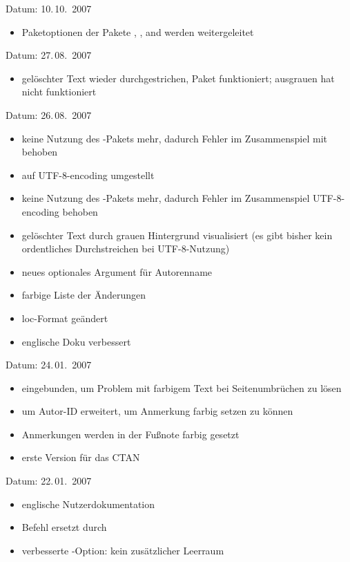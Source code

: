 Datum: 10.\,10.~2007
\begin{itemize}
	\item Paketoptionen der Pakete , , and  werden weitergeleitet
\end{itemize}


Datum: 27.\,08.~2007
\begin{itemize}
	\item gelöschter Text wieder durchgestrichen, Paket  funktioniert; ausgrauen hat nicht funktioniert
\end{itemize}


Datum: 26.\,08.~2007
\begin{itemize}
	\item keine Nutzung des -Pakets mehr, dadurch Fehler im Zusammenspiel mit  behoben
	\item auf UTF-8-encoding umgestellt
	\item keine Nutzung des -Pakets mehr, dadurch Fehler im Zusammenspiel UTF-8-encoding behoben
	\item gelöschter Text durch grauen Hintergrund visualisiert (es gibt bisher kein ordentliches Durchstreichen bei UTF-8-Nutzung)
	\item neues optionales Argument für Autorenname
	\item farbige Liste der Änderungen
	\item loc-Format geändert
	\item englische Doku verbessert
\end{itemize}


Datum: 24.\,01.~2007
\begin{itemize}
	\item {} eingebunden, um Problem mit farbigem Text bei Seitenumbrüchen zu lösen
	\item {} um Autor-ID erweitert, um Anmerkung farbig setzen zu können
	\item Anmerkungen werden in der Fußnote farbig gesetzt
	\item erste Version für das CTAN
\end{itemize}


Datum: 22.\,01.~2007
\begin{itemize}
	\item englische Nutzerdokumentation
	\item Befehl  ersetzt durch 
	\item verbesserte -Option: kein zusätzlicher Leerraum
\end{itemize}

